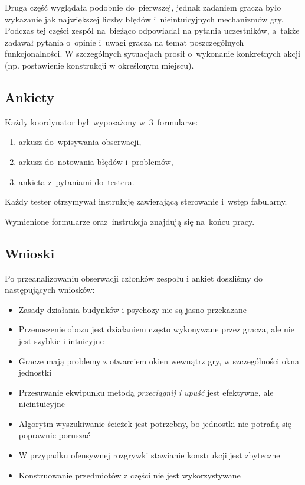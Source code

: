 \documentclass[licencjacka]{pracamgr}
\begin{document}
      Druga część wyglądała podobnie do~pierwszej, jednak zadaniem gracza było wykazanie
      jak największej liczby błędów i~nieintuicyjnych mechanizmów gry.
      Podczas tej części zespół na~bieżąco odpowiadał na pytania uczestników,
      a~także zadawał pytania o~opinie i~uwagi gracza na temat poszczególnych funkcjonalności.
      W szczególnych sytuacjach prosił o~wykonanie konkretnych akcji (np. postawienie konstrukcji w określonym miejscu).

      \subsection{Ankiety}
      Każdy koordynator był~wyposażony w~3~formularze:
      \begin{enumerate}
	\item arkusz do~wpisywania obserwacji,
	\item arkusz do~notowania błędów i~problemów,
	\item ankieta z~pytaniami do~testera.
      \end{enumerate}
      Każdy tester otrzymywał instrukcję zawierającą sterowanie i~wstęp fabularny.

      \noindent
      Wymienione formularze oraz~instrukcja znajdują się na~końcu pracy.

      \subsection{Wnioski}
      Po przeanalizowaniu obserwacji członków zespołu i ankiet doszliśmy do następujących wniosków:
      \begin{itemize}
       \item Zasady działania budynków i psychozy nie są jasno przekazane
       \item Przenoszenie obozu jest działaniem często wykonywane przez gracza, ale nie jest szybkie i intuicyjne
       \item Gracze mają problemy z otwarciem okien wewnątrz gry, w szczególności okna jednostki
       \item Przesuwanie ekwipunku metodą \emph{przeciągnij i upuść} jest efektywne, ale nieintuicyjne
       \item Algorytm wyszukiwanie ścieżek jest potrzebny, bo jednostki nie potrafią się poprawnie poruszać
       \item W przypadku ofensywnej rozgrywki stawianie konstrukcji jest zbyteczne
       \item Konstruowanie przedmiotów z części nie jest wykorzystywane
      \end{itemize}
\end{document}
